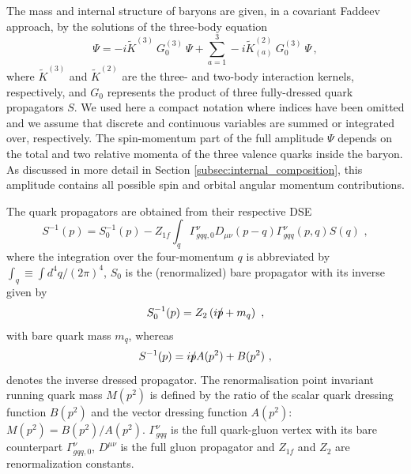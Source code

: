The mass and internal structure of baryons are given, in a covariant
Faddeev approach, by the solutions of the three-body equation
\begin{equation}\label{eq:3bBSEcompact}
\Psi = -i\widetilde{K}^{(3)}~G_0^{(3)}~\Psi + \sum_{a=1}^3 -i\widetilde{K}_{(a)}^{(2)}~G_0^{(3)}~\Psi\,,
\end{equation}
where $\widetilde{K}^{(3)}$ and $\widetilde{K}^{(2)}$ are the three- and two-body interaction kernels, respectively, and $G_0$ represents the product of three fully-dressed quark propagators $S$. We used here a compact notation where indices have been omitted and we assume that discrete and continuous variables are summed or integrated over, respectively. 
The spin-momentum part of the full amplitude $\Psi$ depends on 
the total and two relative momenta of the three valence quarks inside 
the baryon. As discussed in more detail in Section \ref{subsec:internal_composition}, 
this amplitude contains all possible spin and orbital angular momentum contributions.

The quark propagators are obtained from their respective DSE
\begin{equation}\label{eq:quarkDSE}
 S^{-1}(p)=S^{-1}_0(p)-Z_{1f}\int_q \Gamma^\nu_{gqq,0}
D_{\mu\nu}(p-q)\Gamma^\nu_{gqq}(p,q)S(q)\,\,,
\end{equation}
%
where the integration over the four-momentum $q$ is abbreviated by
$\int_q \equiv \int d^4 q/ {(2\pi)^4}$, $S_0$ is the (renormalized) 
bare propagator with its inverse given by
%
\begin{equation}\label{eq:bare_prop}
 S^{-1}_0(p)=Z_2\left(i\Slash{p}+m_q\right)\,\,,
\end{equation}
%
with bare quark mass $m_q$, whereas  
\begin{equation}\label{eq:prop}
 S^{-1}(p)=i\Slash{p} A(p^2) + B(p^2)\,\,,
\end{equation}
denotes the inverse dressed propagator. The renormalisation point invariant 
running quark mass $M(p^2)$ is defined by the ratio of the scalar 
quark dressing function $B(p^2)$ and the vector dressing function 
$A(p^2)$: $M(p^2) = B(p^2)/A(p^2)$.
$\Gamma^\nu_{gqq}$ is the full quark-gluon vertex with 
its bare counterpart $\Gamma^\nu_{gqq,0}$, $D^{\mu\nu}$ is the full
gluon propagator and $Z_{1f}$ and $Z_2$ are renormalization constants. 


